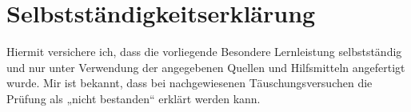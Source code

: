\thispagestyle{empty}
\chapter*{Selbstständigkeitserklärung}
 
Hiermit versichere ich, dass die vorliegende Besondere Lernleistung
selbstständig und nur unter Verwendung der angegebenen Quellen und
Hilfsmitteln angefertigt wurde. Mir ist bekannt, dass bei nachgewiesenen
Täuschungsversuchen die Prüfung als „nicht bestanden“ erklärt werden
kann. 
 
\vspace{1cm}
